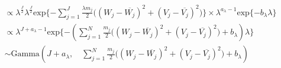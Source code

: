 \documentclass[a4paper, 12pt]{article}
\begin{document}
\begin{itemize}
\begin{equation*}
\begin{aligned}
		& \propto \lambda^{\frac{J}{2}} \lambda^{\frac{J}{2}} \mbox{exp}\{-\sum_{j=1}^J \frac{\lambda m_j}{2}\Big((W_j - \overline{W_j})^2 + (V_j - \overline{V_j})^2\Big)\} \times \lambda^{a_{\lambda}-1}\mbox{exp}\{-b_{\lambda}\lambda\}\\
		& \propto \lambda^{{J} + a_{\lambda}-1}\mbox{exp}\{-(\sum_{j=1}^N \frac{ m_j}{2}\Big((W_j - \overline{W_j})^2 + (V_j - \overline{V_j})^2\Big)+b_{\lambda})\lambda\} \\
		&\sim \mbox{Gamma}(J + a_{\lambda},\quad \sum_{j=1}^N \frac{ m_j}{2}\Big((W_j - \overline{W_j})^2+ (V_j - \overline{V_j})^2 \Big)+b_{\lambda})	
		\end{aligned}
		\end{equation*} 
\end{itemize}
 
\end{document}
